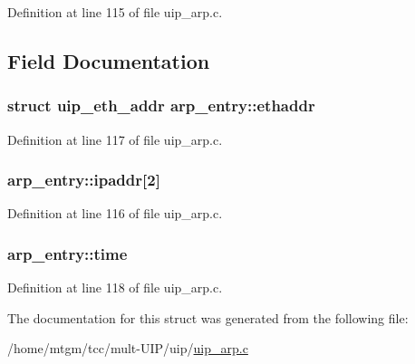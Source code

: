 Definition at line 115 of file uip\_\-arp.c.



\subsection{Field Documentation}
\hypertarget{structarp__entry_ab1f6241831c656ebeaaff4952ac6e8e1}{
\subsubsection[{ethaddr}]{\setlength{\rightskip}{0pt plus 5cm}struct {\bf uip\_\-eth\_\-addr} {\bf arp\_\-entry::ethaddr}}}
\label{structarp__entry_ab1f6241831c656ebeaaff4952ac6e8e1}


Definition at line 117 of file uip\_\-arp.c.

\hypertarget{structarp__entry_a8a3e31d58737749048a8fa5ed8cd7008}{
\subsubsection[{ipaddr}]{ {\bf arp\_\-entry::ipaddr}\mbox{[}2\mbox{]}}}
\label{structarp__entry_a8a3e31d58737749048a8fa5ed8cd7008}


Definition at line 116 of file uip\_\-arp.c.

\hypertarget{structarp__entry_a6d8bbe3159efcfa7fe1615779a660557}{
\subsubsection[{time}]{ {\bf arp\_\-entry::time}}}
\label{structarp__entry_a6d8bbe3159efcfa7fe1615779a660557}


Definition at line 118 of file uip\_\-arp.c.



The documentation for this struct was generated from the following file:\begin{DoxyCompactItemize}
\item 
/home/mtgm/tcc/mult-\/UIP/uip/\hyperlink{uip__arp_8c}{uip\_\-arp.c}\end{DoxyCompactItemize}
